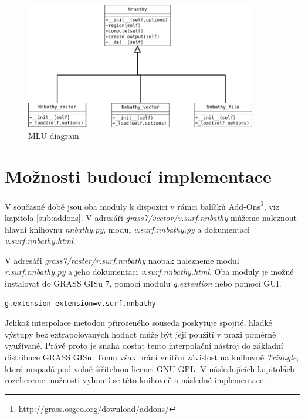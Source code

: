 \documentclass[12pt,a4paper]{article}
\begin{document}
\begin{figure}[h!]
\centering
\includegraphics[width=0.9\textwidth]{img/mlu.png}
\caption{MLU diagram}
\label{fig:vystup_rast_map}
\end{figure}

\newpage
\section{Možnosti budoucí implementace}
V současné době jsou oba moduly k dispozici v rámci balíčků
Add-Ons\footnote{\url{http://grass.osgeo.org/download/addons/}}, viz kapitola \ref{sub:addons}. V adresáři
\emph{grass7/vector/v.surf.nnbathy} můžeme naleznout hlavní knihovnu
\emph{nnbathy.py}, modul \emph{v.surf.nnbathy.py} a dokumentaci
\emph{v.surf.nnbathy.html}.

V adresáři \emph{grass7/raster/r.surf.nnbathy} naopak nalezneme modul
\emph{r.surf.nnbathy.py} a jeho dokumentaci
\emph{v.surf.nnbathy.html}. Oba moduly je možné instalovat do GRASS
GISu 7, pomocí modulu \emph{g.extention} nebo pomocí GUI.

\bigskip
\begin{lstlisting}[caption={Stáhnutí modulu v.surf.nnbathy pomocí g.extention}]
g.extension extension=v.surf.nnbathy
\end{lstlisting}

\bigskip 

Jelikož interpolace metodou přirozeného souseda poskytuje
spojité, hladké výstupy bez extrapolovaných hodnot může být její
použití v praxi poměrně využívané. Právě proto je snaha dostat tento
interpolační nástroj do základní distribuce GRASS GISu. Tomu však
brání vnitřní závislost na knihovně \emph{Triangle}, která nespadá pod volně
šiřitelnou licenci GNU GPL. V následujících kapitolách rozebereme
možnosti vyhnutí se této knihovně a následné implementace.
\end{document}
